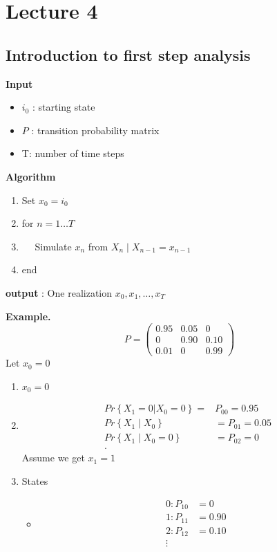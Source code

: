 \documentclass{article}
\theoremstyle{remark}
\begin{document}
 \newpage
 \section{Lecture 4}%
 \label{sec:lecture_4}

 \subsection{Introduction to first step analysis}%
 \label{sub:introduction_to_first_step_analysis}

 \textbf{Input} 
 \begin{itemize}
   \item $i_{0}$ : starting state
    \item $P$ : transition probability matrix
    \item T: number of time steps
 \end{itemize}
 \textbf{Algorithm} 
 \begin{enumerate}
   \item Set $x_{0} = i_{0}$
   \item for $n=1 \ldots T$
   \item $\quad   $ Simulate $x_{n}$ from $X_{n}  \mid  X_{n-1} = x_{n-1}$
   \item end
 \end{enumerate}
 
 \textbf{output} : One realization $x_{0}, x_{1} , \ldots, x_{T}$ 
 
 \begin{tcolorbox}
   \textbf{Example.} 
   \[
   P = \begin{pmatrix}
   0.95  &  0.05  &  0 \\
   0  &  0.90  &  0.10 \\
   0.01  &  0  &  0.99
   \end{pmatrix} 
   \] 
   Let $x_{0} = 0$
   \begin{enumerate}
     \item $x_{0} = 0$  
     \item 
       \begin{align*}
       Pr \left \{ X_{1} = 0 | X_{0} = 0 \right \} = &  P_{00} = 0.95  \\
       Pr \left \{ X_{1}  \mid  X_{0}  \right \}  &=  P_{01} = 0.05 \\
       Pr \left \{ X_{1}  \mid  X_{0} = 0 \right \}  &=  P_{02} = 0 \\
       .\end{align*}
       Assume we get $x_{1} = 1$
     \item States 
       \begin{itemize}
         \item \[
             \begin{split}
         0: P_{10}  &=  0 \\
         1: P_{11 } &=  0.90 \\
         2: P_{12} &=  0.10 \\
         \vdots  \\
             \end{split} 
         \] 
       \end{itemize}
   \end{enumerate}
 \end{tcolorbox}
\end{document}
